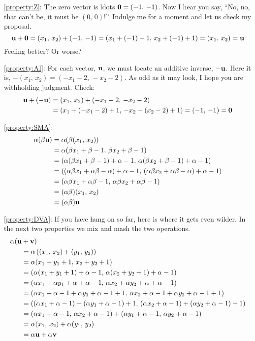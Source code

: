 \documentclass{ximera}
\begin{document}
\begin{example}
\ref{property:Z}:  The zero vector is ldots  $\mathbf{0}=(-1,\,-1)$.  Now I hear you say, ``No, no, that can't be, it must be $(0,\,0)$!''.  Indulge me for a moment and let us check my proposal.
\[
  \mathbf{u}+\mathbf{0}=(x_1,\,x_2)+(-1,\,-1)=(x_1+(-1)+1,\,x_2+(-1)+1)=(x_1,\,x_2)=\mathbf{u}
\]
Feeling better?  Or worse?

\ref{property:AI}:  For each vector, $\mathbf{u}$, we must locate an additive inverse, $\mathbf{-u}$.  Here it is, $-(x_1,\,x_2)=(-x_1-2,\,-x_2-2)$.  As odd as it may look, I hope you are withholding judgment.  Check:
\begin{align*}
  \mathbf{u}+ (\mathbf{-u})&=(x_1,\,x_2)+(-x_1-2,\,-x_2-2)\\
&=(x_1+(-x_1-2)+1,\,-x_2+(x_2-2)+1)=(-1,\,-1)=\mathbf{0}
\end{align*}

\ref{property:SMA}:
\begin{align*}
\alpha(\beta\mathbf{u})
&=\alpha(\beta(x_1,\,x_2))\\
&=\alpha(\beta x_1+\beta-1,\,\beta x_2+\beta-1)\\
&=(\alpha(\beta x_1+\beta-1)+\alpha-1,\,\alpha(\beta x_2+\beta-1)+\alpha-1)\\
&=((\alpha\beta x_1+\alpha\beta-\alpha)+\alpha-1,\,(\alpha\beta x_2+\alpha\beta-\alpha)+\alpha-1)\\
&=(\alpha\beta x_1+\alpha\beta-1,\,\alpha\beta x_2+\alpha\beta-1)\\
&=(\alpha\beta)(x_1,\,x_2)\\
&=(\alpha\beta)\mathbf{u}
\end{align*}



\ref{property:DVA}:  If you have hung on so far, here is where it gets even wilder.  In the next two properties we mix and mash the two operations.
\begin{align*}
\alpha(\mathbf{u}&+\mathbf{v})\\
&=\alpha\left((x_1,\,x_2)+(y_1,\,y_2)\right)\\
&=\alpha(x_1+y_1+1,\,x_2+y_2+1)\\
&=(\alpha(x_1+y_1+1)+\alpha-1,\,\alpha(x_2+y_2+1)+\alpha-1)\\
&=(\alpha x_1+\alpha y_1+\alpha+\alpha-1,\,\alpha x_2+\alpha y_2+\alpha+\alpha-1)\\
&=(\alpha x_1+\alpha-1+\alpha y_1+\alpha-1+1,\,\alpha x_2+\alpha-1+\alpha y_2+\alpha-1+1)\\
&=((\alpha x_1+\alpha-1)+(\alpha y_1+\alpha-1)+1,\,(\alpha x_2+\alpha-1)+(\alpha y_2+\alpha-1)+1)\\
&=(\alpha x_1+\alpha-1,\,\alpha x_2+\alpha-1)+(\alpha y_1+\alpha-1,\,\alpha y_2+\alpha-1)\\
&=\alpha(x_1,\,x_2)+\alpha(y_1,\,y_2)\\
&=\alpha\mathbf{u}+\alpha\mathbf{v}
\end{align*}





\end{example}
\end{document}
